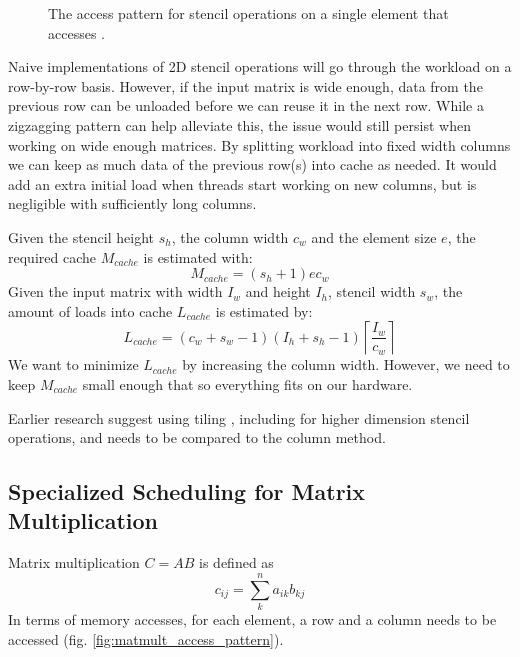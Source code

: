 \documentclass{article}
\newcommand{\TODO}[1]{\noindent{\color{red}\textbf{[TODO] #1}}}
\newcommand{\ceil}[1]{\left\lceil #1 \right\rceil}
\begin{document}
\begin{multicols}{2}
\begin{figure}[H]
    \centering
    \caption{
        The access pattern for stencil operations on a single element  that accesses .
    }
    \label{fig:stencil_access_pattern}
\end{figure}

Naive implementations of 2D stencil operations will go through the workload on a row-by-row basis.
However, if the input matrix is wide enough, data from the previous row can be unloaded before we can reuse it in the next row.
While a zigzagging pattern can help alleviate this, the issue would still persist when working on wide enough matrices.
By splitting workload into fixed width columns we can keep as much data of the previous row(s) into cache as needed.
It would add an extra initial load when threads start working on new columns, but is negligible with sufficiently long columns.

Given the stencil height $s_h$, the column width $c_w$ and the element size $e$, the required cache $M_{cache}$ is estimated with:
\[
    M_{cache} = (s_h + 1) e c_w
\]
Given the input matrix with width $I_w$ and height $I_h$, stencil width $s_w$, the amount of loads into cache $L_{cache}$ is estimated by:
\[
    L_{cache} = (c_w + s_w - 1) (I_h + s_h - 1) \ceil{\frac{I_w}{c_w}}
\]
We want to minimize $L_{cache}$ by increasing the column width. 
However, we need to keep $M_{cache}$ small enough that so everything fits on our hardware.

Earlier research suggest using tiling \cite{rivera2000tiling}, including for higher dimension stencil operations, and needs to be compared to the column method.


\TODO{Column wise access figures}

\subsection{Specialized Scheduling for Matrix Multiplication}
Matrix multiplication $C = AB$ is defined as
\[
    c_{ij} = \sum^n_k{a_{ik}b_{kj}}
\]
In terms of memory accesses, for each element, a row and a column needs to be accessed (fig. \ref{fig:matmult_access_pattern}).


\end{multicols}
\end{document}
